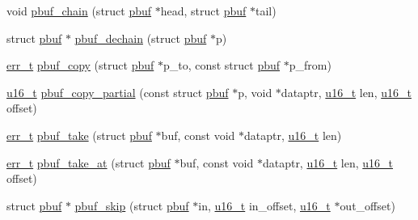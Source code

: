 \begin{DoxyCompactItemize}
\item 
void \hyperlink{group__pbuf_ga831c9a72bda1d3bd4c7b96f5a0e3b891}{pbuf\+\_\+chain} (struct \hyperlink{structpbuf}{pbuf} $\ast$head, struct \hyperlink{structpbuf}{pbuf} $\ast$tail)
\item 
struct \hyperlink{structpbuf}{pbuf} $\ast$ \hyperlink{openmote-cc2538_2lwip_2src_2include_2lwip_2pbuf_8h_abf3d29c4f43986b4cb5eb314d5b9729d}{pbuf\+\_\+dechain} (struct \hyperlink{structpbuf}{pbuf} $\ast$p)
\item 
\hyperlink{group__infrastructure__errors_gaf02d9da80fd66b4f986d2c53d7231ddb}{err\+\_\+t} \hyperlink{group__pbuf_gaba88511dee3df4b631fde691f421320d}{pbuf\+\_\+copy} (struct \hyperlink{structpbuf}{pbuf} $\ast$p\+\_\+to, const struct \hyperlink{structpbuf}{pbuf} $\ast$p\+\_\+from)
\item 
\hyperlink{group__compiler__abstraction_ga77570ac4fcab86864fa1916e55676da2}{u16\+\_\+t} \hyperlink{group__pbuf_gac2f1f58fd36042e82af46f5015720899}{pbuf\+\_\+copy\+\_\+partial} (const struct \hyperlink{structpbuf}{pbuf} $\ast$p, void $\ast$dataptr, \hyperlink{group__compiler__abstraction_ga77570ac4fcab86864fa1916e55676da2}{u16\+\_\+t} len, \hyperlink{group__compiler__abstraction_ga77570ac4fcab86864fa1916e55676da2}{u16\+\_\+t} offset)
\item 
\hyperlink{group__infrastructure__errors_gaf02d9da80fd66b4f986d2c53d7231ddb}{err\+\_\+t} \hyperlink{group__pbuf_gad1e31e370271335b197272af2724ca85}{pbuf\+\_\+take} (struct \hyperlink{structpbuf}{pbuf} $\ast$buf, const void $\ast$dataptr, \hyperlink{group__compiler__abstraction_ga77570ac4fcab86864fa1916e55676da2}{u16\+\_\+t} len)
\item 
\hyperlink{group__infrastructure__errors_gaf02d9da80fd66b4f986d2c53d7231ddb}{err\+\_\+t} \hyperlink{group__pbuf_gae1cf2bf7454ff87ff377b0b2262f9b44}{pbuf\+\_\+take\+\_\+at} (struct \hyperlink{structpbuf}{pbuf} $\ast$buf, const void $\ast$dataptr, \hyperlink{group__compiler__abstraction_ga77570ac4fcab86864fa1916e55676da2}{u16\+\_\+t} len, \hyperlink{group__compiler__abstraction_ga77570ac4fcab86864fa1916e55676da2}{u16\+\_\+t} offset)
\item 
struct \hyperlink{structpbuf}{pbuf} $\ast$ \hyperlink{group__pbuf_gabe4dfb2409c87a7c52c9a22a779f92e9}{pbuf\+\_\+skip} (struct \hyperlink{structpbuf}{pbuf} $\ast$in, \hyperlink{group__compiler__abstraction_ga77570ac4fcab86864fa1916e55676da2}{u16\+\_\+t} in\+\_\+offset, \hyperlink{group__compiler__abstraction_ga77570ac4fcab86864fa1916e55676da2}{u16\+\_\+t} $\ast$out\+\_\+offset)
\item 

\end{DoxyCompactItemize}
